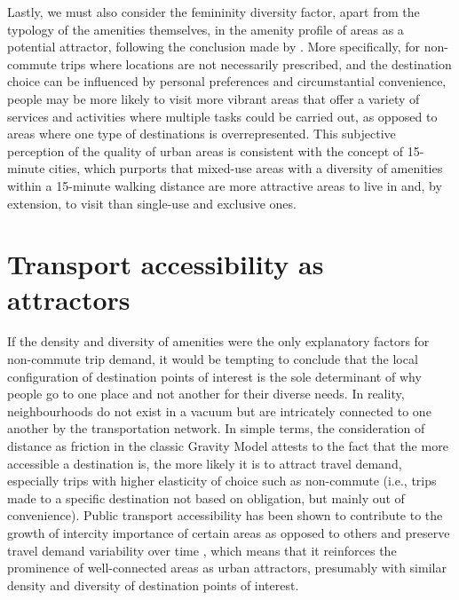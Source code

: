 Lastly, we must also consider the femininity diversity factor, apart from the typology of the amenities themselves, in the amenity profile of areas as a potential attractor, following the conclusion made by \citet{cerveroTravelDemand3Ds1997}. More specifically, for non-commute trips where locations are not necessarily prescribed, and the destination choice can be influenced by personal preferences and circumstantial convenience, people may be more likely to visit more vibrant areas that offer a variety of services and activities where multiple tasks could be carried out, as opposed to areas where one type of destinations is overrepresented. This subjective perception of the quality of urban areas is consistent with the concept of 15-minute cities, which purports that mixed-use areas with a diversity of amenities within a 15-minute walking distance are more attractive areas to live in and, by extension, to visit than single-use and exclusive ones. \citep{khavarian-garmsirGardenCity15Minute2023}

\section{Transport accessibility as attractors}

If the density and diversity of amenities were the only explanatory factors for non-commute trip demand, it would be tempting to conclude that the local configuration of destination points of interest is the sole determinant of why people go to one place and not another for their diverse needs. In reality, neighbourhoods do not exist in a vacuum but are intricately connected to one another by the transportation network. In simple terms, the consideration of distance as friction in the classic Gravity Model attests to the fact that the more accessible a destination is, the more likely it is to attract travel demand, especially trips with higher elasticity of choice such as non-commute (i.e., trips made to a specific destination not based on obligation, but mainly out of convenience). 
Public transport accessibility has been shown to contribute to the growth of intercity importance of certain areas as opposed to others and preserve travel demand variability over time \citep{zhongMeasuringVariabilityMobility2015}, which means that it reinforces the prominence of well-connected areas as urban attractors, presumably with similar density and diversity of destination points of interest. 

